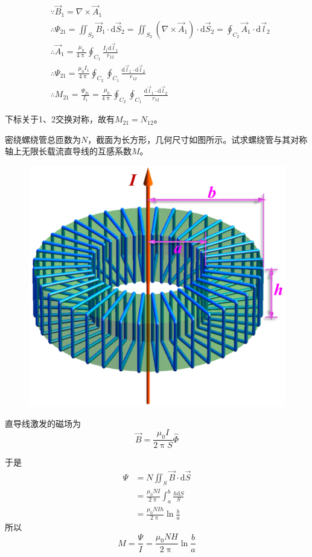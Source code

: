 \documentclass[
	12pt, %
	a4paper, %
]{myLegrandOrangeBook}
\newcommand{\rmd}{\mathrm{d}}
\begin{document}
\begin{equation*}
    \begin{aligned}
        & \because \overrightarrow{B}_1 = \nabla \times \overrightarrow{A}_1 \\
        & \therefore \varPsi_{21}=\iint_{S_2} \overrightarrow{B}_1 \cdot \rmd \overrightarrow{S}_2=\iint_{S_2}\left(\nabla \times \overrightarrow{A}_1\right) \cdot \rmd \overrightarrow{S}_2=\oint_{C_2} \overrightarrow{A}_1 \cdot \rmd \overrightarrow{l}_2 \\
        & \therefore \overrightarrow{A}_1=\frac{\mu_0}{4 \uppi} \oint_{C_1} \frac{I_1 \rmd \overrightarrow{l}_1}{r_{12}} \\
        & \therefore \varPsi_{21}=\frac{\mu_0 I_1}{4 \uppi} \oint_{C_2} \oint_{C_1} \frac{\rmd \overrightarrow{l}_1 \cdot \rmd \overrightarrow{l}_2}{r_{12}} \\
        & \therefore M_{21}=\frac{\Psi_{21}}{I_1}=\frac{\mu_0}{4 \uppi} \oint_{C_2} \oint_{C_1} \frac{\rmd \vec{l}_1 \cdot \rmd \vec{l}_2}{r_{12}}
    \end{aligned}
\end{equation*}

下标关于1、2交换对称，故有\(M_{21} = N_{12}\)。


\begin{exercise}
密绕螺绕管总匝数为\(N\)，截面为长方形，几何尺寸如图所示。试求螺绕管与其对称轴上无限长载流直导线的互感系数\(M\)。
\end{exercise}

\begin{figure}[!h]
    \centering
    \includegraphics[width = .25\textwidth]{graphics/互感例题.png}
\end{figure}

直导线激发的磁场为
\[
\overrightarrow{B} = \frac{\mu_0 I}{2 \uppi S} \hat{\varPhi}
\]

于是
\begin{equation*}
    \begin{aligned}
        \varPsi &= N \iint_S \overrightarrow{B} \cdot \rmd \overrightarrow{S} \\
        &= \frac{\mu_0 NI}{2 \uppi} \int_{a}^{b} \frac{h \rmd S}{S} \\
        &= \frac{\mu_0 NIh}{2 \uppi} \ln \frac{b}{a}
    \end{aligned}
\end{equation*}
所以
\begin{equation*}
    M = \frac{\varPsi}{I} = \frac{\mu_0 NH}{2 \uppi} \ln \frac{b}{a}
\end{equation*}
\end{document}
